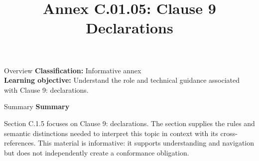 \documentclass[10pt,letterpaper]{article}
\title{Annex C.01.05: Clause 9 Declarations}
\author{}
\date{}
\begin{document}
\maketitle
\begin{CornellOverviewBox}{Overview}
\textbf{Classification:} Informative annex\\[2pt]
\textbf{Learning objective:} Understand the role and technical guidance associated with Clause 9: declarations.
\end{CornellOverviewBox}\begin{CornellSummaryBox}{Summary}
{\sffamily\bfseries\color{Accent} Summary}\par\vspace{3pt}Section C.1.5 focuses on Clause 9: declarations. The section supplies the rules and semantic distinctions needed to interpret this topic in context with its cross-references. This material is informative: it supports understanding and navigation but does not independently create a conformance obligation.
\end{CornellSummaryBox}
\end{document}
